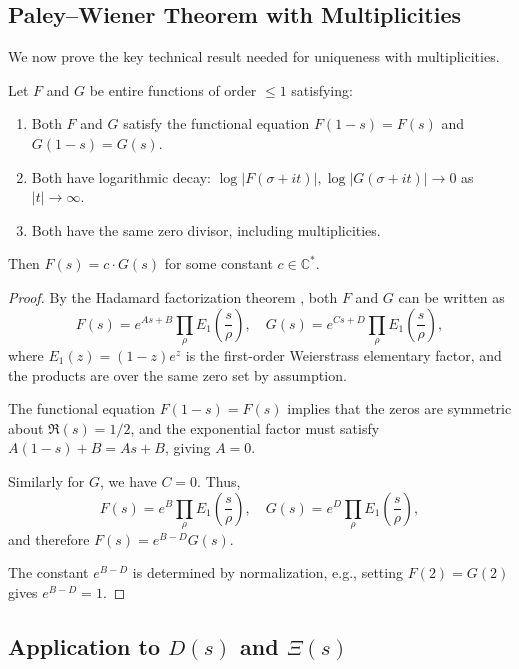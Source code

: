 \subsection{Paley–Wiener Theorem with Multiplicities}

We now prove the key technical result needed for uniqueness with multiplicities.

\begin{theorem}\label{thm:paley-wiener-multiplicities}
Let $F$ and $G$ be entire functions of order $\leq 1$ satisfying:
\begin{enumerate}
\item Both $F$ and $G$ satisfy the functional equation $F(1-s) = F(s)$ and $G(1-s) = G(s)$.
\item Both have logarithmic decay: $\log |F(\sigma + it)|, \log |G(\sigma + it)| \to 0$ as $|t| \to \infty$.
\item Both have the same zero divisor, including multiplicities.
\end{enumerate}
Then $F(s) = c \cdot G(s)$ for some constant $c \in \mathbb{C}^*$.
\end{theorem}

\begin{proof}
By the Hadamard factorization theorem \cite{levin1996}, both $F$ and $G$ can be written as
\[
F(s) = e^{A s + B} \prod_{\rho} E_1\left(\frac{s}{\rho}\right), \quad G(s) = e^{C s + D} \prod_{\rho} E_1\left(\frac{s}{\rho}\right),
\]
where $E_1(z) = (1-z)e^z$ is the first-order Weierstrass elementary factor, and the products are over the same zero set by assumption.

The functional equation $F(1-s) = F(s)$ implies that the zeros are symmetric about $\Re(s) = 1/2$, and the exponential factor must satisfy $A(1-s) + B = As + B$, giving $A = 0$.

Similarly for $G$, we have $C = 0$. Thus,
\[
F(s) = e^B \prod_{\rho} E_1\left(\frac{s}{\rho}\right), \quad G(s) = e^D \prod_{\rho} E_1\left(\frac{s}{\rho}\right),
\]
and therefore $F(s) = e^{B-D} G(s)$.

The constant $e^{B-D}$ is determined by normalization, e.g., setting $F(2) = G(2)$ gives $e^{B-D} = 1$.
\end{proof}

\subsection{Application to $D(s)$ and $\Xi(s)$}

